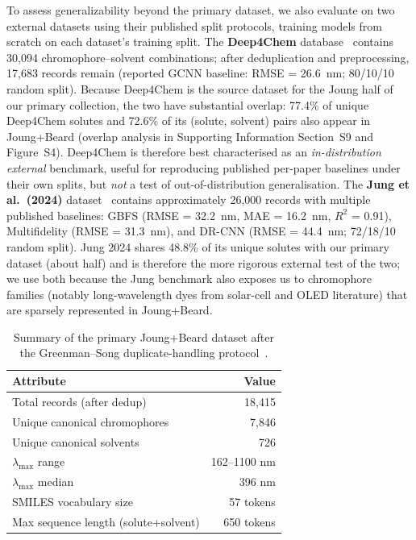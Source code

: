 \documentclass[journal=jcisd8,manuscript=article]{achemso}
\begin{document}
To assess generalizability beyond the primary dataset, we also evaluate on two external datasets using their published split protocols, training models from scratch on each dataset's training split.
The \textbf{Deep4Chem} database~\cite{joung2021deep} contains 30,094 chromophore--solvent combinations; after deduplication and preprocessing, 17,683 records remain (reported GCNN baseline: RMSE = 26.6~nm; 80/10/10 random split). Because Deep4Chem is the source dataset for the Joung half of our primary collection, the two have substantial overlap: 77.4\% of unique Deep4Chem solutes and 72.6\% of its (solute, solvent) pairs also appear in Joung+Beard (overlap analysis in Supporting Information Section~S9 and Figure~S4). Deep4Chem is therefore best characterised as an \emph{in-distribution external} benchmark, useful for reproducing published per-paper baselines under their own splits, but \emph{not} a test of out-of-distribution generalisation.
The \textbf{Jung et al.\ (2024)} dataset~\cite{jung2024machine} contains approximately 26,000 records with multiple published baselines: GBFS (RMSE = 32.2~nm, MAE = 16.2~nm, $R^2$ = 0.91), Multifidelity (RMSE = 31.3~nm), and DR-CNN (RMSE = 44.4~nm; 72/18/10 random split). Jung 2024 shares 48.8\% of its unique solutes with our primary dataset (about half) and is therefore the more rigorous external test of the two; we use both because the Jung benchmark also exposes us to chromophore families (notably long-wavelength dyes from solar-cell and OLED literature) that are sparsely represented in Joung+Beard.

\begin{table}[htbp]
\centering
\caption{Summary of the primary Joung+Beard dataset after the Greenman--Song duplicate-handling protocol~\cite{greenman2022multifidelity,song2025fluortools}.}
\label{tab:dataset_summary}
\begin{tabular}{lr}
\toprule
\textbf{Attribute} & \textbf{Value} \\
\midrule
Total records (after dedup) & 18,415 \\
Unique canonical chromophores & 7,846 \\
Unique canonical solvents & 726 \\
$\lambda_{\max}$ range & 162--1100 nm \\
$\lambda_{\max}$ median & 396 nm \\
SMILES vocabulary size & 57 tokens \\
Max sequence length (solute+solvent) & 650 tokens \\
\bottomrule
\end{tabular}
\end{table}
\end{document}
